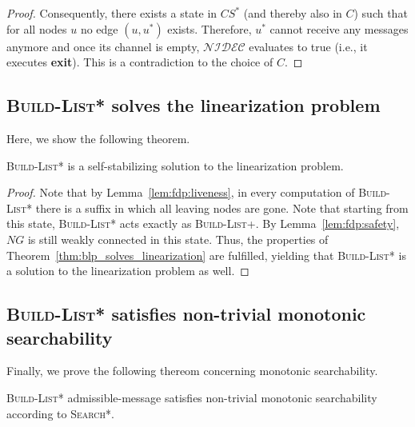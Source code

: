 \documentclass[a4paper,USenglish]{lipics}
\newcommand{\blp}{\textsc{Build-List+}\xspace}
\newcommand{\blpp}{\textsc{Build-List*}\xspace}
\newcommand{\srpp}{\textsc{Search*}\xspace}
\newcommand{\nidec}{$\mathcal{NIDEC}$\xspace}
\begin{document}
\begin{proof}
Consequently, there exists a state in $CS^*$ (and thereby also in $C$) such that for all nodes $u$ no edge $(u,u^*)$ exists. Therefore, $u^*$ cannot receive any messages anymore and once its channel is empty, \nidec evaluates to true (i.e., it executes \textbf{exit}). This is a contradiction to the choice of $C$.

 \end{proof}


\subsection{\blpp solves the linearization problem}
\label{sec:blpp_linearization_proof}
Here, we show the following theorem.

\begin{theorem}\label{thm:blpp_solves_linearization}
 \blpp is a self-stabilizing solution to the linearization problem.
\end{theorem}

\begin{proof}
Note that by Lemma~\ref{lem:fdp:liveness}, in every computation of \blpp there is a suffix in which all leaving nodes are gone.
Note that starting from this state, \blpp acts exactly as \blp.
By Lemma~\ref{lem:fdp:safety}, $NG$ is still weakly connected in this state.
Thus, the properties of Theorem~\ref{thm:blp_solves_linearization} are fulfilled, yielding that \blpp is a solution to the linearization problem as well. 
\end{proof}

\subsection{\blpp satisfies non-trivial monotonic searchability}
\label{sec:blpp_monotonic_searchability_proof}
Finally, we prove the following thereom concerning monotonic searchability.

\begin{theorem}\label{thm:blpp_guarantees_monotonic_searchability}
 \blpp admissible-message satisfies non-trivial monotonic searchability according to \srpp.
\end{theorem}
\end{document}
